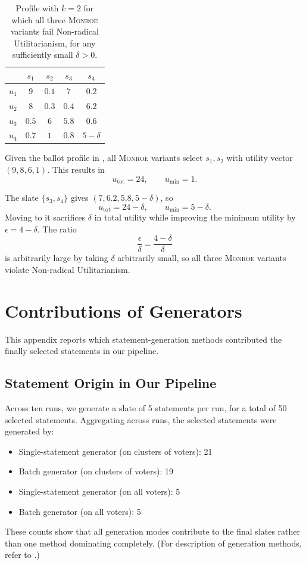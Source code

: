 \documentclass[11pt]{article}
\newcommand{\Monroe}{\textsc{Monroe}}
\begin{document}
\begin{table}[t]
\centering
\begin{tabular}{lcccc}
\hline
 & $s_1$ & $s_2$ & $s_3$ & $s_4$ \\
\hline
$u_1$ & $9$   & $0.1$ & $7$   & $0.2$ \\
$u_2$ & $8$   & $0.3$ & $0.4$ & $6.2$ \\
$u_3$ & $0.5$ & $6$   & $5.8$ & $0.6$ \\
$u_4$ & $0.7$ & $1$   & $0.8$ & $5-\delta$ \\
\hline
\end{tabular}
\caption{Profile with $k=2$ for which all three \Monroe{} variants fail
Non-radical Utilitarianism, for any sufficiently small \(\delta>0\).}
\label{tab:failure-monroe-nru}
\end{table}

Given the ballot profile in , all \Monroe{} variants select \(s_1, s_2\) with utility vector
\((9,8,6,1)\). This results in 
\[
u_{\mathrm{tot}}=24,\qquad u_{\mathrm{min}}=1 .
\]

The slate \(\{s_3,s_4\}\) gives \((7,6.2,5.8,5-\delta)\), so
\[
u_{\mathrm{tot}}=24-\delta,\qquad u_{\mathrm{min}}=5-\delta .
\]
Moving to it sacrifices \(\delta\) in total utility while improving the minimum
utility by \(\epsilon=4-\delta\). The ratio
\[
\frac{\epsilon}{\delta}=\frac{4-\delta}{\delta}
\]
is arbitrarily large by taking \(\delta\) arbitrarily small, so all
three \Monroe{} variants violate Non-radical Utilitarianism.

\section{Contributions of Generators}
\label{app:statement-origin}

This appendix reports which statement-generation methods contributed the finally selected statements in our pipeline.

\subsection{Statement Origin in Our Pipeline}

Across ten runs, we generate a slate of 5 statements per run, for a total of 50 selected statements. Aggregating across runs, the selected statements were generated by:
\begin{itemize}
    \item %
Single-statement generator (on clusters of voters): 21
    \item Batch generator (on clusters of voters): 19
    \item Single-statement generator (on all voters): 5
    \item Batch generator (on all voters): 5
\end{itemize}

These counts show that all generation modes contribute to the final slates rather than one method dominating completely.
(For description of generation methods, refer to .)
\end{document}
